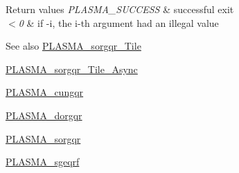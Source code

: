 \begin{DoxyRetVals}{Return values}
{\em P\+L\+A\+S\+M\+A\+\_\+\+S\+U\+C\+C\+E\+S\+S} & successful exit \\
\hline
{\em $<$0} & if -\/i, the i-\/th argument had an illegal value\\
\hline
\end{DoxyRetVals}
\begin{DoxySeeAlso}{See also}
\hyperlink{group__float__Tile_gaec88819afb466ae7e88a1743915aebac_gaec88819afb466ae7e88a1743915aebac}{P\+L\+A\+S\+M\+A\+\_\+sorgqr\+\_\+\+Tile} 

\hyperlink{group__float__Tile__Async_gaf15801641689a99513f4493164c19e0f_gaf15801641689a99513f4493164c19e0f}{P\+L\+A\+S\+M\+A\+\_\+sorgqr\+\_\+\+Tile\+\_\+\+Async} 

\hyperlink{group__PLASMA__Complex32__t_ga6c696165c8c276260ba80eff16e4d291_ga6c696165c8c276260ba80eff16e4d291}{P\+L\+A\+S\+M\+A\+\_\+cungqr} 

\hyperlink{group__double_ga5137c6e07ebf2faddae220daa28999ba_ga5137c6e07ebf2faddae220daa28999ba}{P\+L\+A\+S\+M\+A\+\_\+dorgqr} 

\hyperlink{group__float_ga4b6a6aa9e5da7961424f3afb62a69562_ga4b6a6aa9e5da7961424f3afb62a69562}{P\+L\+A\+S\+M\+A\+\_\+sorgqr} 

\hyperlink{group__float_gad2dff40bb75ba6ee7a91306e0a3e889e_gad2dff40bb75ba6ee7a91306e0a3e889e}{P\+L\+A\+S\+M\+A\+\_\+sgeqrf} 
\end{DoxySeeAlso}
\hypertarget{group__float_ga4f42eb41e34bdf290b36fe5ce8e576b7_ga4f42eb41e34bdf290b36fe5ce8e576b7}{}
